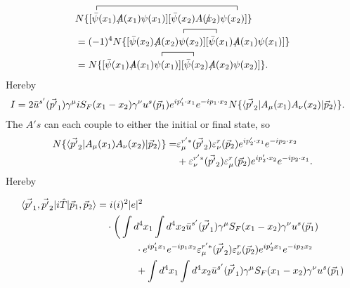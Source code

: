 \begin{example}
	\begin{equation}
		\begin{split}
			\contraction{,,,,}{\vec{p'}}{,,,,,,,,,,,,,,,,,,,,,,,,,,,,\vec{k'}|}{\bar{\psi}}
			&N\{[\bar{\psi}(x_1)\slashed{A}(x_1)\psi(x_1)][\bar{\psi}(x_2)\slashed{A(x_2)}\psi(x_2)]\}\\
			&\contraction{,,,,,,,,,,,,,,,,,,,,,,,,}{\vec{p'}}{,..,\vec{k'}|}{\bar{\psi}}
			=(-1)^4N\{[\bar{\psi}(x_2)\slashed A(x_2)\psi(x_2)][\bar{\psi}(x_1)\slashed A(x_1)\psi(x_1)]\}\\
			&\contraction{,,,,,,,,,,,,,,,,,,,}{\vec{p'}}{,,,\vec{k'}|}{\bar{\psi}}
			=N\{[\bar{\psi}(x_1)\slashed A(x_1)\psi(x_1)][\bar{\psi}(x_2)\slashed A(x_2)\psi(x_2)]\}.
		\end{split}
	\end{equation} 	
	Hereby
	\begin{equation}
		\begin{split}
			I&=2\bar{u}^{s'}(\vec{p'}_1)\gamma^\mu iS_{F}(x_1-x_2)\gamma^\nu u^s(\vec{p}_1)e^{ip'_1\cdot x_1}e^{-ip_1\cdot x_2}N\{\braket{\vec{p'}_2|A_\mu(x_1)A_\nu(x_2)|\vec{p}_2}\}.
		\end{split}
	\end{equation} 
	The $A's$ can each couple to either the initial or final state, so
	\begin{equation}
		\begin{split}
			N\{\braket{\vec{p'}_2|A_\mu(x_1)A_\nu(x_2)|\vec{p}_2}\}=&\varepsilon_\mu^{r'*}(\vec{p'}_2)\varepsilon_\nu^{r}(\vec{p}_2)e^{ip'_2\cdot x_1}e^{-ip_2\cdot x_2}\\
			&+\varepsilon_\nu^{r'*}(\vec{p'}_2)\varepsilon_\mu^{r}(\vec{p}_2)e^{ip'_2\cdot x_2}e^{-ip_2\cdot x_1}.
		\end{split}
	\end{equation} 
	Hereby
	\begin{footnotesize}
	 \begin{equation}
		\begin{split}
			\braket{\vec{p'}_1,\vec{p'}_2|i\hat{T}|\vec{p}_1, \vec{p}_2}&=i(i)^2|e|^2\\
			&\quad \cdot\bigg(\int d^4x_1\int d^4x_2
			\bar{u}^{s'}(\vec{p'}_1)\gamma^\mu S_{F}(x_1-x_2)\gamma^\nu u^s(\vec{p}_1)\\
			&\qquad\qquad \cdot e^{ip'_1 x_1}e^{-ip_1 x_2}\varepsilon_\mu^{r'*}(\vec{p'}_2)\varepsilon_\nu^{r}(\vec{p}_2)e^{ip'_2 x_1}e^{-ip_2 x_2}\\
			&\qquad\qquad+\int d^4x_1\int d^4x_2
			\bar{u}^{s'}(\vec{p'}_1)\gamma^\mu S_{F}(x_1-x_2)\gamma^\nu u^s(\vec{p}_1)\\

\end{split}
\end{equation}
\end{footnotesize}
\end{example}
